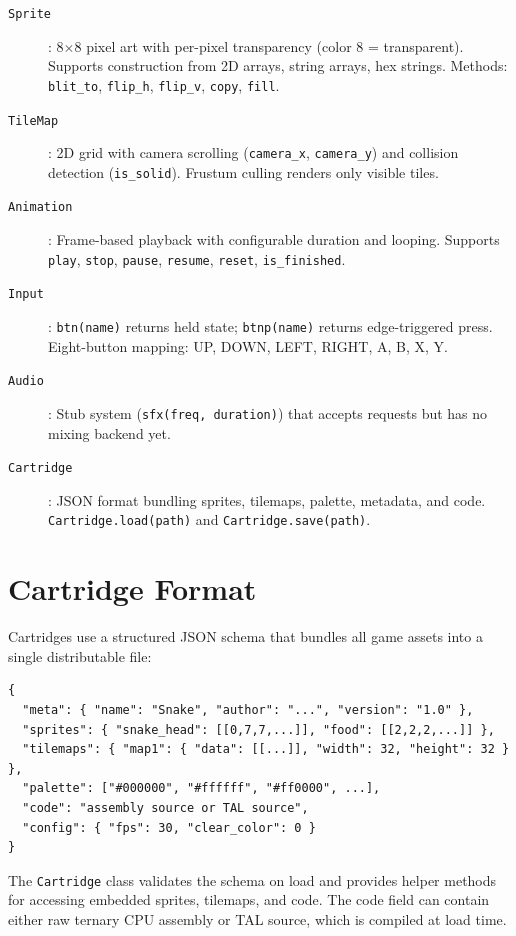 \documentclass[10pt,a4paper,twoside]{book}
\begin{document}
\begin{description}
    \item[\texttt{Sprite}]: 8$\times$8 pixel art with per-pixel transparency
          (color 8 = transparent). Supports construction from 2D arrays, string
          arrays, hex strings. Methods: \texttt{blit\_to}, \texttt{flip\_h},
          \texttt{flip\_v}, \texttt{copy}, \texttt{fill}.
    \item[\texttt{TileMap}]: 2D grid with camera scrolling (\texttt{camera\_x},
          \texttt{camera\_y}) and collision detection (\texttt{is\_solid}).
          Frustum culling renders only visible tiles.
    \item[\texttt{Animation}]: Frame-based playback with configurable duration and
          looping. Supports \texttt{play}, \texttt{stop}, \texttt{pause},
          \texttt{resume}, \texttt{reset}, \texttt{is\_finished}.
    \item[\texttt{Input}]: \texttt{btn(name)} returns held state; \texttt{btnp(name)}
          returns edge-triggered press. Eight-button mapping: UP, DOWN, LEFT, RIGHT,
          A, B, X, Y.
    \item[\texttt{Audio}]: Stub system (\texttt{sfx(freq, duration)}) that accepts
          requests but has no mixing backend yet.
    \item[\texttt{Cartridge}]: JSON format bundling sprites, tilemaps, palette,
          metadata, and code. \texttt{Cartridge.load(path)} and
          \texttt{Cartridge.save(path)}.
\end{description}

\section{Cartridge Format}

Cartridges use a structured JSON schema that bundles all game assets into a
single distributable file:

\begin{verbatim}
{
  "meta": { "name": "Snake", "author": "...", "version": "1.0" },
  "sprites": { "snake_head": [[0,7,7,...]], "food": [[2,2,2,...]] },
  "tilemaps": { "map1": { "data": [[...]], "width": 32, "height": 32 } },
  "palette": ["#000000", "#ffffff", "#ff0000", ...],
  "code": "assembly source or TAL source",
  "config": { "fps": 30, "clear_color": 0 }
}
\end{verbatim}

The \texttt{Cartridge} class validates the schema on load and provides helper
methods for accessing embedded sprites, tilemaps, and code. The code field
can contain either raw ternary CPU assembly or TAL source, which is compiled
at load time.
\end{document}

